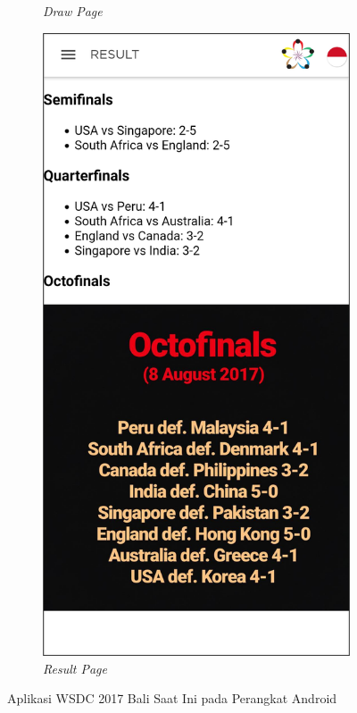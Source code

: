 \begin{figure}[H]
\begin{subfigure}[b]{0.247\textwidth}
	    \caption{{\it Draw Page}}
	    \label{fig:wsdcAppDraw}
     \end{subfigure}
	\begin{subfigure}[b]{0.247\textwidth}
    \centering
	    \includegraphics[scale=0.4]{Gambar/ResultPage.png}
	    \caption{{\it Result Page}}
	    \label{fig:wsdcAppResult}
     \end{subfigure}
	\caption{Aplikasi WSDC 2017 Bali Saat Ini pada Perangkat Android}
        \label{fig:ssAppWSDC2017Bali2}
\end{figure}

